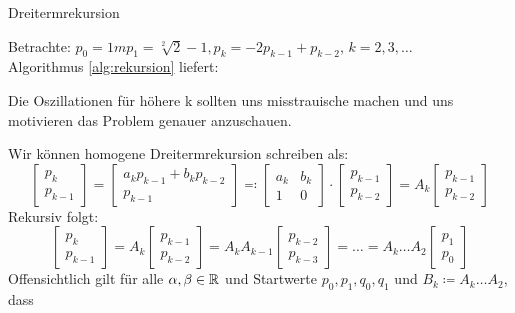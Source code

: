 \begin{algorithm}[H]
\label{alg:rekursion}
 \caption{Dreitermrekursion}
 \end{algorithm}
 \begin{example}
 Betrachte: $p_0=1m p_1=\sqrt[2]{2}-1, p_k= -2p_{k-1}+p_{k-2}$, $k=2,3,\ldots$ \\
 Algorithmus \ref{alg:rekursion} liefert:


Die Oszillationen für höhere k sollten uns misstrauische machen und uns motivieren das Problem genauer anzuschauen.
 \end{example}
Wir können homogene Dreitermrekursion schreiben als:
\[
\begin{bmatrix}
	p_k \\
	p_{k-1}
\end{bmatrix}= \begin{bmatrix}
a_kp_{k-1} + b_kp_{k-2} \\
p_{k-1}
\end{bmatrix} \eqqcolon \begin{bmatrix}
a_k & b_k \\
1 & 0
\end{bmatrix} \cdot \begin{bmatrix}
p_{k-1} \\
p_{k-2}
\end{bmatrix} = A_k \begin{bmatrix}
p_{k-1} \\
p_{k-2}
\end{bmatrix}
\]
Rekursiv folgt:
\[
\begin{bmatrix}
p_k \\
p_{k-1}\end{bmatrix} = A_k \begin{bmatrix}
p_{k-1} \\
p_{k-2}
\end{bmatrix}= A_k A_{k-1} \begin{bmatrix}
p_{k-2} \\
p_{k-3}
\end{bmatrix}= \ldots = A_k \ldots A_2 \begin{bmatrix}
p_1 \\
p_0
\end{bmatrix}
\]
Offensichtlich gilt für alle $\alpha, \beta \in \mathbb{R}$ und Startwerte $p_0,p_1,q_0,q_1$ und $B_k \coloneqq A_k \ldots A_2$, dass
